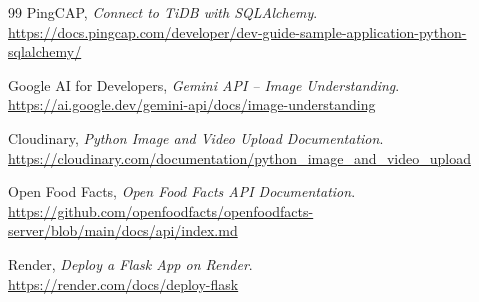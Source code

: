 \documentclass[12pt,a4paper,oneside]{book}
\begin{document}
\begin{thebibliography}{99}
		PingCAP,
		\textit{Connect to TiDB with SQLAlchemy}.
		\\
		\url{https://docs.pingcap.com/developer/dev-guide-sample-application-python-sqlalchemy/}
		
		
		Google AI for Developers,
		\textit{Gemini API -- Image Understanding}.
		\\
		\url{https://ai.google.dev/gemini-api/docs/image-understanding}
		
		Cloudinary,
		\textit{Python Image and Video Upload Documentation}.
		\\
		\url{https://cloudinary.com/documentation/python_image_and_video_upload}
		
		
		Open Food Facts,
		\textit{Open Food Facts API Documentation}.
		\\
		\url{https://github.com/openfoodfacts/openfoodfacts-server/blob/main/docs/api/index.md}
		
		
		Render,
		\textit{Deploy a Flask App on Render}.
		\\
		\url{https://render.com/docs/deploy-flask}
		
	\end{thebibliography}
	
	
	
	
\end{document}
